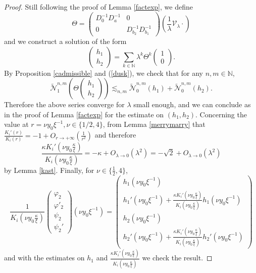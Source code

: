 \documentclass[11 pt]{amsart}
\theoremstyle{definition}
\theoremstyle{remark}
\numberwithin{equation}{section}
\begin{document}
\begin{proof}
  Still following the proof of Lemma \ref{factexp}, we define
  \[ \Theta = \left(\begin{array}{cc}
       D_0^{- 1} D_a^{- 1} & 0\\
       0 & D_{b_2}^{- 1} D_{b_1}^{- 1}
     \end{array}\right) \left(\frac{1}{\lambda}\mathcal{V}_{\lambda} \cdot \right) \]
  and we construct a solution of the form
  \[ \left(\begin{array}{c}
       h_1\\
       h_2
     \end{array}\right) = \sum_{k \in \mathbb{N}} \lambda^k \Theta^k
     \left(\begin{array}{c}
       1\\
       0
     \end{array}\right) . \]
  By Proposition \ref{cadmissible} and (\ref{dusk}), we check that for any $n,
  m \in \mathbb{N}$,
  \[ \widetilde{\mathcal{N}}_1^{n, m} \left( \Theta \left(\begin{array}{c}
       h_1\\
       h_2
     \end{array}\right) \right) \lesssim_{n, m} \widetilde{\mathcal{N}}_0^{n, m}
     (h_1) + \widetilde{\mathcal{N}}_0^{n, m} (h_2). \]
  Therefore the above series converge for $\lambda$ small enough, and we can conclude as in the proof of Lemma \ref{factexp} for the estimate
  on $(h_1, h_2)$. Concerning the value at $r = \nu y_0 \xi^{- 1}, \nu \in \{ 1/2, 4
  \}$, from Lemma \ref{merrymarry} that $\frac{K_i' (r)}{K_i (r)} = - 1 + O_{r
  \rightarrow + \infty} \left( \frac{1}{r^2} \right)$ and therefore
  \[ \frac{\kappa K_i' \left( \nu y_0 \frac{\kappa}{\xi} \right)}{K_i \left( \nu y_0
     \frac{\kappa}{\xi} \right)} = - \kappa + O_{\lambda \rightarrow 0}
     (\lambda^2) = - \sqrt{2} + O_{\lambda \rightarrow 0} (\lambda^2) \]
  by Lemma \ref{kast}. Finally, for $\nu \in \{ \frac 12, 4 \}$,
  \[ \frac{1}{K_i \left( \nu y_0\frac{\kappa}{\xi} \right)}
     \left(\begin{array}{c}
       \varphi_2\\
       \varphi'_2\\
       \psi_2\\
       \psi_2'
     \end{array}\right) (\nu y_0\xi^{- 1}) = \left(\begin{array}{c}
       h_1 (\nu y_0 \xi^{- 1})\\
       h_1' (\nu y_0\xi^{- 1}) + \frac{\kappa K_i' \left( \nu y_0\frac{\kappa}{\xi}
       \right)}{K_i \left( \nu y_0 \frac{\kappa}{\xi} \right)} h_1 (\nu y_0\xi^{-
       1})\\
       h_2 (\nu y_0 \xi^{- 1})\\
       h_2' (\nu y_0\xi^{- 1}) + \frac{\kappa K_i' \left( \nu y_0\frac{\kappa}{\xi}
       \right)}{K_i \left( \nu y_0\frac{\kappa}{\xi} \right)} h_2' (\nu y_0\xi^{-
       1})
     \end{array}\right) \]
  and with the estimates on $h_1$ and $\frac{\kappa K_i' \left( \nu y_0
  \frac{\kappa}{\xi} \right)}{K_i \left( \nu y_0\frac{\kappa}{\xi} \right)}$ we
  check the result.
\end{proof}
\end{document}
